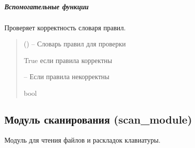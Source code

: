 \documentclass[a4paper,11pt,russian,openany,oneside]{sphinxmanual}
\begin{document}
\subparagraph{Вспомогательные функции}
\label{\detokenize{processing_module:id7}}

\begin{savenotes}\begin{fulllineitems}
\label{\detokenize{processing_module:id8}}
\pysigstartsignatures
\pysiglinewithargsret
{}
{}
{}
\pysigstopsignatures
\sphinxAtStartPar
Проверяет корректность словаря правил.
\begin{quote}\begin{description}
\sphinxAtStartPar
{} (\sphinxstyleliteralemphasis{\sphinxupquote{{[}}}\sphinxstyleliteralemphasis{\sphinxupquote{, }}\sphinxstyleliteralemphasis{\sphinxupquote{ | }}\sphinxstyleliteralemphasis{\sphinxupquote{{]}}}) – Словарь правил для проверки

\sphinxAtStartPar
True если правила корректны

\sphinxAtStartPar
{} – Если правила некорректны

\sphinxAtStartPar
bool

\end{description}\end{quote}

\end{fulllineitems}\end{savenotes}


\sphinxstepscope


\subsection{Модуль сканирования (scan\_module)}
\label{\detokenize{scan_module:scan-module}}\label{\detokenize{scan_module::doc}}
\sphinxAtStartPar
Модуль для чтения файлов и раскладок клавиатуры.
\end{document}
